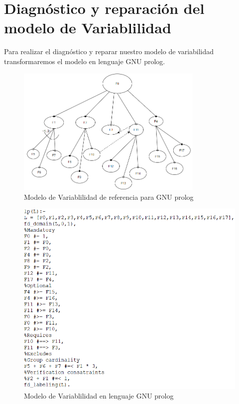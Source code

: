 \documentclass[10pt,a4paper,openany]{book}
\begin{document}
\section{Diagnóstico y reparación del modelo de Variablilidad}
Para realizar el diagnóstico y reparar nuestro modelo de variabilidad transformaremos el modelo en lenguaje GNU prolog.\\
\begin{figure}[h]
	\centering
	\includegraphics[width=0.8\textwidth]{img4}
	\caption{Modelo de Variablilidad de referencia para GNU prolog}
	\label{fig:img4}
\end{figure} 

\begin{figure}[h]
	\centering
	\includegraphics[width=1\textwidth]{gnu}
	\caption{Modelo de Variablilidad en lenguaje GNU prolog}
	\label{fig:gnu}
\end{figure} 
\end{document}
